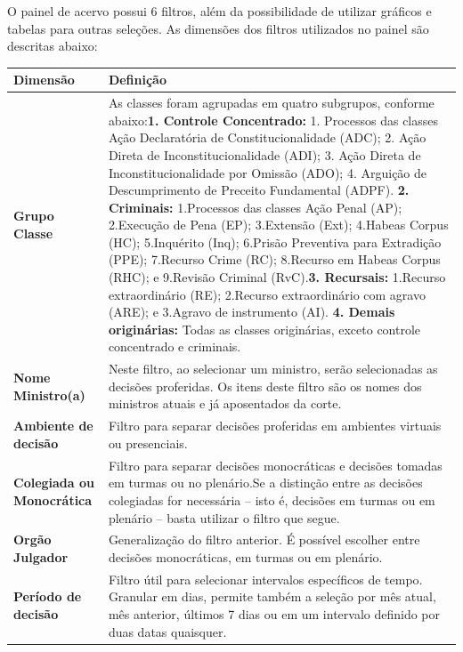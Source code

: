 \documentclass[
]{book}
\begin{document}
O painel de acervo possui 6 filtros, além da possibilidade de utilizar gráficos e tabelas para outras seleções.
As dimensões dos filtros utilizados no painel são descritas abaixo:

\begin{longtable}[]{@{}
  >{\raggedright\arraybackslash}p{}
  >{\raggedright\arraybackslash}p{}@{}}
\toprule
Dimensão & Definição \\
\midrule
\endhead
\textbf{Grupo Classe} & As classes foram agrupadas em quatro subgrupos, conforme abaixo:\textbf{1. Controle Concentrado:} 1. Processos das classes Ação Declaratória de Constitucionalidade (ADC); 2. Ação Direta de Inconstitucionalidade (ADI); 3. Ação Direta de Inconstitucionalidade por Omissão (ADO); 4. Arguição de Descumprimento de Preceito Fundamental (ADPF). \textbf{2. Criminais:} 1.Processos das classes Ação Penal (AP); 2.Execução de Pena (EP); 3.Extensão (Ext); 4.Habeas Corpus (HC); 5.Inquérito (Inq); 6.Prisão Preventiva para Extradição (PPE); 7.Recurso Crime (RC); 8.Recurso em Habeas Corpus (RHC); e 9.Revisão Criminal (RvC).\textbf{3. Recursais:} 1.Recurso extraordinário (RE); 2.Recurso extraordinário com agravo (ARE); e 3.Agravo de instrumento (AI). \textbf{4. Demais originárias:} Todas as classes originárias, exceto controle concentrado e criminais. \\
\textbf{Nome Ministro(a)} & Neste filtro, ao selecionar um ministro, serão selecionadas as decisões proferidas. Os itens deste filtro são os nomes dos ministros atuais e já aposentados da corte. \\
\textbf{Ambiente de decisão} & Filtro para separar decisões proferidas em ambientes virtuais ou presenciais. \\
\textbf{Colegiada ou Monocrática} & Filtro para separar decisões monocráticas e decisões tomadas em turmas ou no plenário.Se a distinção entre as decisões colegiadas for necessária -- isto é, decisões em turmas ou em plenário -- basta utilizar o filtro que segue. \\
\textbf{Orgão Julgador} & Generalização do filtro anterior. É possível escolher entre decisões monocráticas, em turmas ou em plenário. \\
\textbf{Período de decisão} & Filtro útil para selecionar intervalos específicos de tempo. Granular em dias, permite também a seleção por mês atual, mês anterior, últimos 7 dias ou em um intervalo definido por duas datas quaisquer. \\
\bottomrule
\end{longtable}
\end{document}
